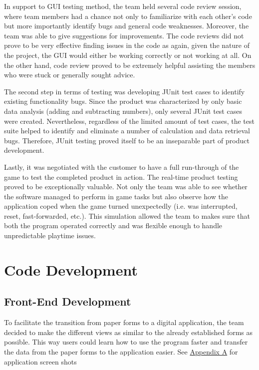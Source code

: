 \documentclass{l3proj}
\begin{document}
In support to GUI testing method, the team held several code review session, where team members had a chance not only to familiarize with each other's code but more importantly identify bugs and general code weaknesses. Moreover, the team was able to give suggestions for improvements. The code reviews did not prove to be very effective finding issues in the code as again, given the nature of the project, the GUI would either be working correctly or not working at all. On the other hand, code review proved to be extremely helpful assisting the members who were stuck or generally sought advice.

The second step in terms of testing was developing JUnit test cases to identify existing functionality bugs. Since the product was characterized by only basic data analysis (adding and subtracting numbers), only several JUnit test cases were created. Nevertheless, regardless of the limited amount of test cases, the test suite helped to identify and eliminate a number of calculation and data retrieval bugs. Therefore, JUnit testing proved itself to be an inseparable part of product development.

Lastly, it was negotiated with the customer to have a full run-through of the game to test the completed product in action. The real-time product testing proved to be exceptionally valuable. Not only the team was able to see whether the software managed to perform in game tasks but also observe how the application coped when the game turned unexpectedly (i.e. was interrupted, reset, fast-forwarded, etc.). This simulation allowed the team to makes sure that both the program operated correctly and was flexible enough to handle unpredictable playtime issues.
\section{Code Development}
\label{sec:development}
\subsection{Front-End Development}

To facilitate the transition from paper forms to a digital application, the team decided to make the different views as similar to the already established forms as possible. This way users could learn how to use the program faster and transfer the data from the paper forms to the application easier. See \hyperref[sec:appendix]{Appendix A} for application screen shots
\end{document}
